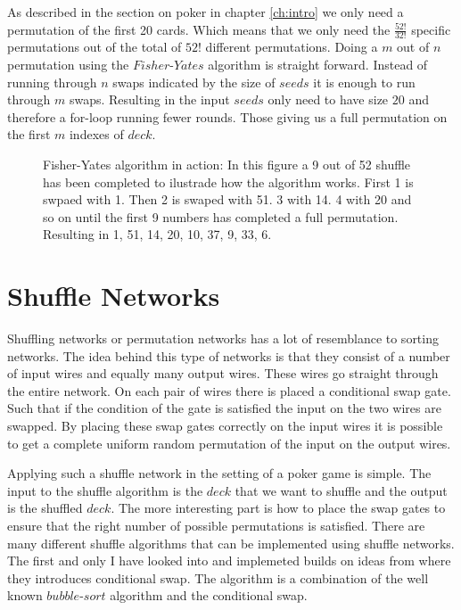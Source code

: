 \bigskip

As described in the section on poker in chapter \ref{ch:intro} we only need a permutation of the first 20 cards. Which means that we only need the $\frac{52!}{32!}$ specific permutations out of the total of $52!$ different permutations. Doing a $m$ out of $n$ permutation using the $Fisher\text{-}Yates$ algorithm is straight forward. Instead of running through $n$ swaps indicated by the size of $seeds$ it is enough to run through $m$ swaps. Resulting in the input $seeds$ only need to have size $20$ and therefore a for-loop running fewer rounds. Those giving us a full permutation on the first $m$ indexes of $deck$.

\begin{figure}
\label{fisher_yates_fig}
\centering
\scalebox{1.5}{}
\caption{Fisher-Yates algorithm in action: In this figure a 9 out of 52 shuffle has been completed to ilustrade how the algorithm works. First 1 is swpaed with 1. Then 2 is swaped with 51. 3 with 14. 4 with 20 and so on until the first 9 numbers has completed a full permutation. Resulting in 1, 51, 14, 20, 10, 37, 9, 33, 6.}
\end{figure}


\section{Shuffle Networks}
Shuffling networks or permutation networks has a lot of resemblance to sorting networks. The idea behind this type of networks is that they consist of a number of input wires and equally many output wires. These wires go straight through the entire network. On each pair of wires there is placed a conditional swap gate. Such that if the condition of the gate is satisfied the input on the two wires are swapped. By placing these swap gates correctly on the input wires it is possible to get a complete uniform random permutation of the input on the output wires.

Applying such a shuffle network in the setting of a poker game is simple. The input to the shuffle algorithm is the $deck$ that we want to shuffle and the output is the shuffled $deck$. The more interesting part is how to place the swap gates to ensure that the right number of possible permutations is satisfied. There are many different shuffle algorithms that can be implemented using shuffle networks. The first and only I have looked into and implemeted builds on ideas from  where they introduces conditional swap. The algorithm is a combination of the well known $bubble\text{-}sort$ algorithm and the conditional swap.


